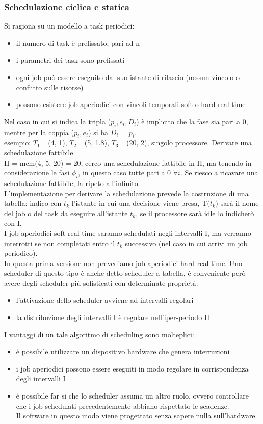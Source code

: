 \documentclass[12pt, oneside]{extbook}
\begin{document}
\subsubsection{Schedulazione ciclica e statica}
Si ragiona su un modello a task periodici:
\begin{itemize}
\item il numero di task è prefissato, pari ad n
\item i parametri dei task sono prefissati
\item ogni job può essere eseguito dal suo istante di rilascio (nessun vincolo o conflitto sulle risorse)
\item possono esistere job aperiodici con vincoli temporali soft o hard real-time
\end{itemize}
Nel caso in cui si indica la tripla ($p_i, e_i, D_i$) è implicito che la fase sia pari a 0, mentre per la coppia ($p_i, e_i$) si ha $D_i$ = $p_i$.\\ esempio: $T_1$= (4, 1), $T_2$= (5, 1.8), $T_3$= (20, 2), singolo processore. Derivare una schedulazione fattibile.\\ H = mcm(4, 5, 20) = 20, cerco una schedulazione fattibile in H, ma tenendo in considerazione le fasi $\phi_i$, in questo caso tutte pari a 0 $\forall i$. Se riesco a ricavare una schedulazione fattibile, la ripeto all'infinito.\\ L'implementazione per derivare la schedulazione prevede la costruzione di una tabella: indico con $t_k$ l'istante in cui una decisione viene presa, T($t_k$) sarà il nome del job o del task da eseguire all'istante $t_k$, se il processore sarà idle lo indicherò con I.\\I job aperiodici soft real-time saranno schedulati negli intervalli I, ma verranno interrotti se non completati entro il $t_k$ successivo (nel caso in cui arrivi un job periodico).\\ In questa prima versione non prevediamo job aperiodici hard real-time. Uno scheduler di questo tipo è anche detto scheduler a tabella, è conveniente però avere degli scheduler più sofisticati con determinate proprietà:
\begin{itemize}
\item l'attivazione dello scheduler avviene ad intervalli regolari
\item la distribuzione degli intervalli I è regolare nell'iper-periodo H
\end{itemize}
I vantaggi di un tale algoritmo di scheduling sono molteplici:
\begin{itemize}
\item è possibile utilizzare un dispositivo hardware che genera interruzioni
\item i job aperiodici possono essere eseguiti in modo regolare in corrispondenza degli intervalli I
\item è possibile far si che lo scheduler assuma un altro ruolo, ovvero controllare che i job schedulati precedentemente abbiano rispettato le scadenze.\\ Il software in questo modo viene progettato senza sapere nulla sull'hardware.
\end{itemize}
\end{document}

